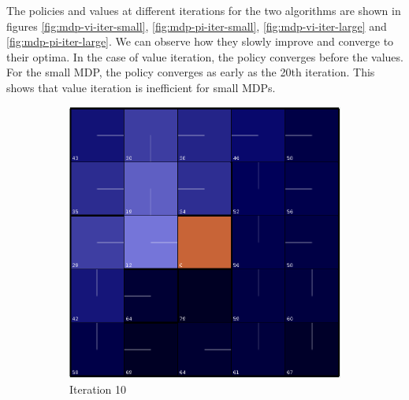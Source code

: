 \documentclass[letterpaper]{article}
\begin{document}
	The policies and values at different iterations for the two algorithms are shown in figures \ref{fig:mdp-vi-iter-small}, \ref{fig:mdp-pi-iter-small}, \ref{fig:mdp-vi-iter-large} and \ref{fig:mdp-pi-iter-large}. We can observe how they slowly improve and converge to their optima. In the case of value iteration, the policy converges before the values. For the small MDP, the policy converges as early as the 20th iteration. This shows that value iteration is inefficient for small MDPs.
	
	\begin{figure}
		\centering
		\begin{subfigure}[t]{.18\textwidth}
			\centering
			\includegraphics[width=\linewidth]{images/small_vi_10}
			\caption{Iteration 10}
		\end{subfigure}
		\begin{subfigure}[t]{.18\textwidth}
			\centering

\end{subfigure}
\end{figure}
\end{document}
